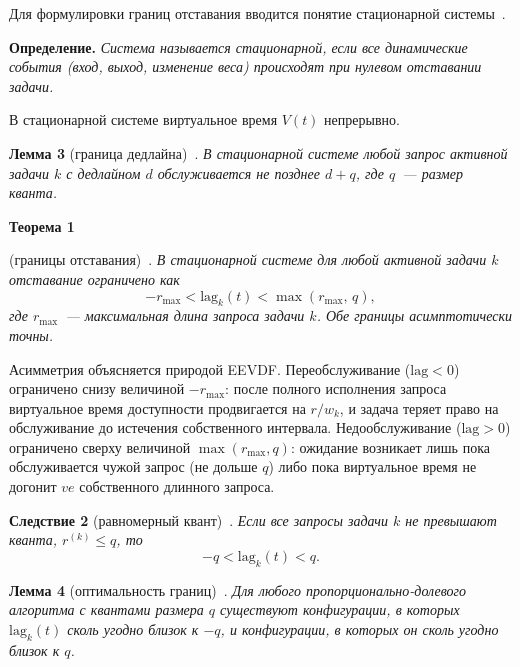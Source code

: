 \documentclass[14pt, oneside]{extbook}
\begin{document}
        Для формулировки границ отставания вводится понятие
        стационарной системы~\cite{stoica}.

        \textbf{Определение.}
        \textit{Система называется стационарной, если все
        динамические события (вход, выход, изменение веса)
        происходят при нулевом отставании задачи.}

        В стационарной системе виртуальное время $V(t)$ непрерывно.

        \textbf{Лемма 3} (граница дедлайна)~\cite{stoica}.
        \textit{В стационарной системе любой запрос активной
        задачи $k$ с дедлайном $d$ обслуживается не позднее
        $d + q$, где $q$~--- размер кванта.}

        \hypertarget{thm:lag-bound}{\textbf{Теорема 1}} (границы отставания)~\cite{stoica}.
        \textit{В стационарной системе для любой активной
        задачи $k$ отставание ограничено как}
        \begin{equation*}
                -r_{\max} < \mathrm{lag}_k(t) < \max(r_{\max},\, q),
        \end{equation*}
        \textit{где $r_{\max}$~--- максимальная длина запроса
        задачи $k$. Обе границы асимптотически точны.}

        Асимметрия объясняется природой EEVDF. Переобслуживание
        ($\mathrm{lag} < 0$) ограничено снизу величиной $-r_{\max}$:
        после полного исполнения запроса виртуальное время
        доступности продвигается на $r/w_k$, и задача теряет право
        на обслуживание до истечения собственного интервала.
        Недообслуживание ($\mathrm{lag} > 0$) ограничено сверху
        величиной $\max(r_{\max}, q)$: ожидание возникает лишь пока
        обслуживается чужой запрос (не дольше $q$) либо пока
        виртуальное время не догонит $ve$ собственного длинного
        запроса.

        \textbf{Следствие 2} (равномерный квант)~\cite{stoica}.
        \textit{Если все запросы задачи $k$ не превышают
        кванта, $r^{(k)} \leq q$, то}
        \begin{equation*}
                -q < \mathrm{lag}_k(t) < q.
        \end{equation*}

        \textbf{Лемма 4} (оптимальность границ)~\cite{stoica}.
        \textit{Для любого пропорционально-долевого алгоритма с
        квантами размера $q$ существуют конфигурации, в которых
        $\mathrm{lag}_k(t)$ сколь угодно близок к $-q$, и
        конфигурации, в которых он сколь угодно близок к $q$.}
\end{document}
